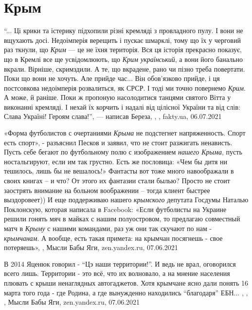  
 
 
 
 
\chapter{Крым}
\label{sec:slova.krym}

\enquote{... Ці крики та істерику підхопили різні кремляді з провладного пулу. І вони не
вщухають досі. Недоімперія верещить і пускає шмарклі, тому що їх у черговий раз
ткнули, що \emph{Крим} — це не їхня територія. Вся ця історія прекрасно показує, що в
Кремлі все ще усвідомлюють, що \emph{Крим український}, а вони його банально вкрали.
Вірніше, скримздили. А те, що вкрадене, рано чи пізно треба повертати. Поки що
вони не хочуть. Але прийде час... Він обов'язково прийде, і ця постсовкова
недоімперія розвалиться, як СРСР. І тоді ми точно повернемо \emph{Крим}. А може, й
раніше. Поки ж пропоную насолодитися танцями святого Вітта у виконанні
кремляді. І нехай їх корчить і надалі від цілісної України та від слів: Слава
Україні! Героям слава!}, — написав Береза,
, , fakty.ua, 06.07.2021

«Форма футболистов с очертаниями \emph{Крыма} не подстегнет напряженность.
Спорт есть спорт», - разъяснил Песков и заявил, что не стоит разжигать
ненависть.  Пусть себе бегают по футбольному полю с изображением \emph{нашего
Крыма}, пусть ностальгируют, если им так грустно. Есть же пословица: «Чем бы
дитя ни тешилось, лишь бы не вешалось!» Фантасты вот тоже много навоображали в
своих книгах – и что? От этого их фантазии стали былью? Просто не стоит
заострять внимание на больном воображении – тогда клиент быстрее выздоровеет))
И еще поддерживаю нашего \emph{крымского} депутата Госдумы Наталью Поклонскую,
которая написала в Facebook: «Если футболисты на Украине решили гонять мяч в
майках с нашим полуостровом, то предлагаю совместный матч в \emph{Крыму} с
нашими командами, раз уж они так скучают по нам - \emph{крымчанам}. А вообще,
есть такая примета: на крымчан посягнешь - свое потеряешь»,
, Мысли Бабы Яги, zen.yandex.ru, 07.06.2021

В 2014 Яценюк говорил - \enquote{Цэ наши территории!}. И ведь не врал,
оговорился всего лишь. Территории - это всё, что их волновало, а на мнение
населения плювать с крыши ненаглядных автогаджетов. Хотя крымчане ясно дали
понять 16 марта того года - где Родина, а где вынужденно находились
\enquote{благодаря} ЕБН... ,
,
, Мысли Бабы Яги, zen.yandex.ru, 07.06.2021


